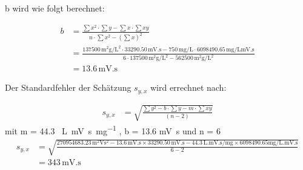 \documentclass{article}
\begin{document}
  b wird wie folgt berechnet:

\begin{align}
  b &= \frac{\sum x^2 \cdot \sum y - \sum x \cdot \sum x y}{n \cdot \sum x^2 - (\sum x )^2}\\
    & = \frac{\num{137500} \, \si{\square\milli\gram\per\square\liter} \cdot  \num{33290.50} \,  \si{\milli\volt.\second} -   750 \, \si{\milli\gram\per\liter} \cdot  \num{6098490.65} \, \si{\milli\gram\per\liter} \si{\milli\volt.\second}}{6  \cdot \num{137500} \, \si{\square\milli\gram\per\square\liter}  - \num{562500} \, \si{\square\milli\gram\per\square\liter}}\\
    &  = 13.6 \, \si{\milli\volt.\second}
\end{align}



  Der Standardfehler der Schätzung $s_{y,x}$ wird errechnet nach:

\begin{align}
 s_{y,x} &= \sqrt{\frac{\sum y^2 - b \cdot \sum y - m \cdot \sum xy}{(n-2)}}
\end{align}
mit m = 44.3 \, \si{\liter.\milli\volt\second\per\milli\gram} , b = 13.6 \si{\milli\volt.\second} und n = 6
\begin{align*}
  s_{y,x} &=\sqrt{ \frac{ \num{270954683.23} \, \si{\square\milli\volt} \si{\square\second} - 13.6 \, \si{\milli\volt.\second} \times \num{33290.50} \, \si{\milli\volt.\second}
   -  44.3 \, \si{\liter.\milli\volt.\second\per\milli\gram} \times \num{6098490.65} \si{\milli\gram\per\liter.\milli\volt.\second} } {6-2}} \\
  &= 343 \, \si{\milli\volt.\second}
\end{align*}
\end{document}
